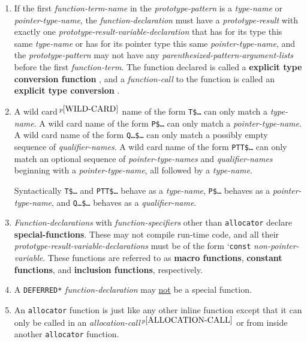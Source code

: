 \documentclass[12pt]{article}
\newcommand{\key}[1]{{\rm \bfseries #1}}
\newcommand{\skey}[2]{{\rm \bfseries #1#2}}
\newcommand{\pagnote}[1]{$\,^{p\pageref{#1}}$}
\begin{document}
\begin{enumerate}
This distinguishes {\em function-calls} from {\em reference-expressions}.
\item
If the first {\em function-term-name} in the {\em prototype-pattern}
is a {\em type-name} or {\em pointer-type-name},
the {\em function-declaration} must have
a {\em prototype-result} with exactly
one {\em prototype-result-variable-declaration}
that has for its type this same {\em type-name} or has for its pointer type
this same {\em pointer-type-name},
and the {\em prototype-pattern} may not have any
{\em parenthesized-pattern-argument-lists} before the first
{\em function-term}.  The function
declared is called a \key{explicit type conversion function}%
\label{EXPLICIT-TYPE-CONVERSION-FUNCTION}, and a {\em function-call}
to the function is called an \key{explicit type conversion}%
\label{EXPLICIT-TYPE-CONVERSION}.
\item\label{PROTOTYPE-WILD-CARDS}
A wild card\pagnote{WILD-CARD} name of the form {\tt T\$\ldots}
can only match a {\em type-name}.
A wild card name of the form {\tt P\$\ldots} can only match a
{\em pointer-type-name}.
A wild card name of the form {\tt Q\ldots\$\ldots} can only match a
possibly empty sequence of {\em qualifier-names}.
A wild card name of the form {\tt PTT\$\ldots} can only match an
optional sequence of {\em pointer-type-names} and {\em qualifier-names}
beginning with a {\em pointer-type-name}, all followed by a {\em type-name}.

Syntactically {\tt T\$\ldots} and {\tt PTT\$\ldots} behave as
a {\em type-name},
{\tt P\$\ldots} behaves as a {\em pointer-type-name},
and {\tt Q\ldots\$\ldots} behaves as a {\em qualifier-name}.
\item
{\em Function-declarations} with {\em function-specifiers} other
than {\tt allocator} declare
\skey{special-function}s.  These may not compile run-time code,
and all their {\em prototype-result-variable-declarations}
must be of the form `{\tt const} {\em non-pointer-variable}.
These functions are referred to as \skey{macro function}s,
\skey{constant function}s, and \skey{inclusion function}s, respectively.
\item
A {\tt *DEFERRED*} {\em function-declaration} may \underline{not} be
a special function.
\item
An {\tt allocator} function\label{ALLOCATOR-FUNCTION}
is just like any other inline function
except that it can only be called in
an {\em allocation-call}\pagnote{ALLOCATION-CALL}
or from inside another {\tt allocator} function.

\end{enumerate}
\end{document}
